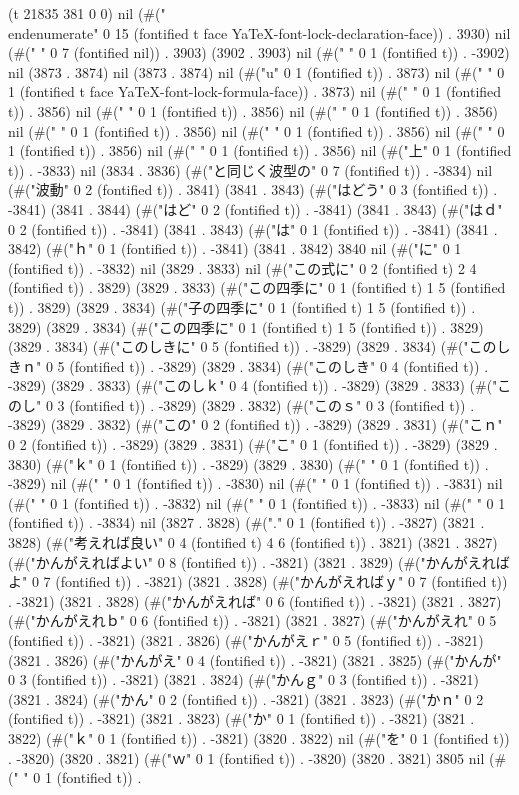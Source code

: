 (t 21835 381 0 0) nil (#("\\end{enumerate}" 0 15 (fontified t face YaTeX-font-lock-declaration-face)) . 3930) nil (#("       " 0 7 (fontified nil)) . 3903) (3902 . 3903) nil (#("
" 0 1 (fontified t)) . -3902) nil (3873 . 3874) nil (3873 . 3874) nil (#("u" 0 1 (fontified t)) . 3873) nil (#("	" 0 1 (fontified t face YaTeX-font-lock-formula-face)) . 3873) nil (#(" " 0 1 (fontified t)) . 3856) nil (#(" " 0 1 (fontified t)) . 3856) nil (#(" " 0 1 (fontified t)) . 3856) nil (#(" " 0 1 (fontified t)) . 3856) nil (#(" " 0 1 (fontified t)) . 3856) nil (#(" " 0 1 (fontified t)) . 3856) nil (#(" " 0 1 (fontified t)) . 3856) nil (#("上" 0 1 (fontified t)) . -3833) nil (3834 . 3836) (#("と同じく波型の" 0 7 (fontified t)) . -3834) nil (#("波動" 0 2 (fontified t)) . 3841) (3841 . 3843) (#("はどう" 0 3 (fontified t)) . -3841) (3841 . 3844) (#("はど" 0 2 (fontified t)) . -3841) (3841 . 3843) (#("はｄ" 0 2 (fontified t)) . -3841) (3841 . 3843) (#("は" 0 1 (fontified t)) . -3841) (3841 . 3842) (#("ｈ" 0 1 (fontified t)) . -3841) (3841 . 3842) 3840 nil (#("に" 0 1 (fontified t)) . -3832) nil (3829 . 3833) nil (#("この式に" 0 2 (fontified t) 2 4 (fontified t)) . 3829) (3829 . 3833) (#("この四季に" 0 1 (fontified t) 1 5 (fontified t)) . 3829) (3829 . 3834) (#("子の四季に" 0 1 (fontified t) 1 5 (fontified t)) . 3829) (3829 . 3834) (#("この四季に" 0 1 (fontified t) 1 5 (fontified t)) . 3829) (3829 . 3834) (#("このしきに" 0 5 (fontified t)) . -3829) (3829 . 3834) (#("このしきｎ" 0 5 (fontified t)) . -3829) (3829 . 3834) (#("このしき" 0 4 (fontified t)) . -3829) (3829 . 3833) (#("このしｋ" 0 4 (fontified t)) . -3829) (3829 . 3833) (#("このし" 0 3 (fontified t)) . -3829) (3829 . 3832) (#("このｓ" 0 3 (fontified t)) . -3829) (3829 . 3832) (#("この" 0 2 (fontified t)) . -3829) (3829 . 3831) (#("こｎ" 0 2 (fontified t)) . -3829) (3829 . 3831) (#("こ" 0 1 (fontified t)) . -3829) (3829 . 3830) (#("ｋ" 0 1 (fontified t)) . -3829) (3829 . 3830) (#(" " 0 1 (fontified t)) . -3829) nil (#(" " 0 1 (fontified t)) . -3830) nil (#(" " 0 1 (fontified t)) . -3831) nil (#(" " 0 1 (fontified t)) . -3832) nil (#(" " 0 1 (fontified t)) . -3833) nil (#(" " 0 1 (fontified t)) . -3834) nil (3827 . 3828) (#("." 0 1 (fontified t)) . -3827) (3821 . 3828) (#("考えれば良い" 0 4 (fontified t) 4 6 (fontified t)) . 3821) (3821 . 3827) (#("かんがえればよい" 0 8 (fontified t)) . -3821) (3821 . 3829) (#("かんがえればよ" 0 7 (fontified t)) . -3821) (3821 . 3828) (#("かんがえればｙ" 0 7 (fontified t)) . -3821) (3821 . 3828) (#("かんがえれば" 0 6 (fontified t)) . -3821) (3821 . 3827) (#("かんがえれｂ" 0 6 (fontified t)) . -3821) (3821 . 3827) (#("かんがえれ" 0 5 (fontified t)) . -3821) (3821 . 3826) (#("かんがえｒ" 0 5 (fontified t)) . -3821) (3821 . 3826) (#("かんがえ" 0 4 (fontified t)) . -3821) (3821 . 3825) (#("かんが" 0 3 (fontified t)) . -3821) (3821 . 3824) (#("かんｇ" 0 3 (fontified t)) . -3821) (3821 . 3824) (#("かん" 0 2 (fontified t)) . -3821) (3821 . 3823) (#("かｎ" 0 2 (fontified t)) . -3821) (3821 . 3823) (#("か" 0 1 (fontified t)) . -3821) (3821 . 3822) (#("ｋ" 0 1 (fontified t)) . -3821) (3820 . 3822) nil (#("を" 0 1 (fontified t)) . -3820) (3820 . 3821) (#("ｗ" 0 1 (fontified t)) . -3820) (3820 . 3821) 3805 nil (#(" " 0 1 (fontified t)) . 